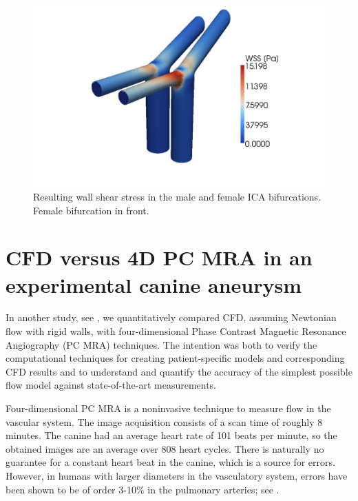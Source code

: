 \begin{figure}
  \center\includegraphics[width=\largefig]{chapters/kvs-2/pdf/icas_wss.pdf}
    \caption{Resulting wall shear stress in the male and female ICA
      bifurcations. Female bifurcation in front.}
    \label{fig:kvs-2:ica_wss_res}
\end{figure}

\section{CFD versus 4D PC MRA in an experimental canine aneurysm} \label{dog_study}

In another study, see \citet{JiangJohnsonValen-SendstadEtAl2010}, we
quantitatively compared CFD, assuming Newtonian flow with rigid walls,
with four-dimensional Phase Contrast Magnetic Resonance Angiography
(PC MRA) techniques. The intention was both to verify the
computational techniques for creating patient-specific models and
corresponding CFD results and to understand and quantify the accuracy
of the simplest possible flow model against state-of-the-art
measurements.

Four-dimensional PC MRA is a noninvasive technique to measure flow in
the vascular system. The image acquisition consists of a scan time of
roughly 8 minutes. The canine had an average heart rate of 101 beats
per minute, so the obtained images are an average over 808 heart
cycles. There is naturally no guarantee for a constant heart beat in
the canine, which is a source for errors. However, in humans with
larger diameters in the vasculatory system, errors have been shown to
be of order 3-10\% in the pulmonary arteries;
see \citet{LotzMeierLeppertEtAl2002,EvansIwaiGristEtAl1993}.

